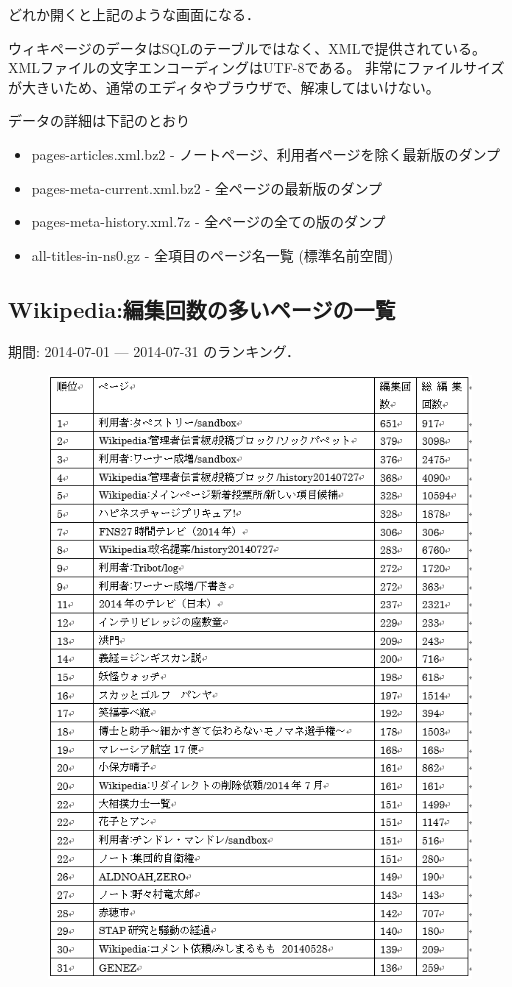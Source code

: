 どれか開くと上記のような画面になる．

ウィキページのデータはSQLのテーブルではなく、XMLで提供されている。XMLファイルの文字エンコーディングはUTF-8である。 非常にファイルサイズが大きいため、通常のエディタやブラウザで、解凍してはいけない。

データの詳細は下記のとおり

\begin{itemize}
 \item pages-articles.xml.bz2 - ノートページ、利用者ページを除く最新版のダンプ
 \item pages-meta-current.xml.bz2 - 全ページの最新版のダンプ
 \item pages-meta-history.xml.7z - 全ページの全ての版のダンプ
 \item all-titles-in-ns0.gz - 全項目のページ名一覧 (標準名前空間)
\end{itemize}

\subsection{Wikipedia:編集回数の多いページの一覧}

期間: 2014-07-01 — 2014-07-31 のランキング．


\begin{figure}[H]
\centering
\includegraphics[width=12cm]{sample6.png}

\end{figure}


